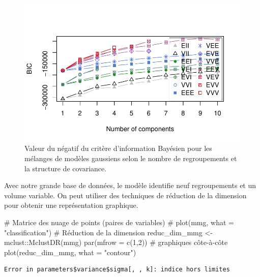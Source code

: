 \documentclass[
  11pt,
  letterpaper,
]{scrbook}
\newenvironment{Shaded}{\begin{snugshade}}{\end{snugshade}}
\newcommand{\AttributeTok}[1]{\textcolor[rgb]{0.40,0.45,0.13}{#1}}
\newcommand{\CommentTok}[1]{\textcolor[rgb]{0.37,0.37,0.37}{#1}}
\newcommand{\DecValTok}[1]{\textcolor[rgb]{0.68,0.00,0.00}{#1}}
\newcommand{\FunctionTok}[1]{\textcolor[rgb]{0.28,0.35,0.67}{#1}}
\newcommand{\NormalTok}[1]{\textcolor[rgb]{0.00,0.23,0.31}{#1}}
\newcommand{\OtherTok}[1]{\textcolor[rgb]{0.00,0.23,0.31}{#1}}
\newcommand{\SpecialCharTok}[1]{\textcolor[rgb]{0.37,0.37,0.37}{#1}}
\newcommand{\StringTok}[1]{\textcolor[rgb]{0.13,0.47,0.30}{#1}}
\theoremstyle{definition}
\theoremstyle{remark}
\begin{document}
\begin{figure}[ht!]

{\centering \includegraphics{./03-regroupements_files/figure-pdf/fig-mclustbic-1.pdf}

}

\caption{\label{fig-mclustbic}Valeur du négatif du critère d'information
Bayésien pour les mélanges de modèles gaussiens selon le nombre de
regroupements et la structure de covariance.}

\end{figure}

Avec notre grande base de données, le modèle identifie neuf
regroupements et un volume variable. On peut utiliser des techniques de
réduction de la dimension pour obtenir une représentation graphique.

\begin{Shaded}
\begin{Highlighting}[]
\CommentTok{\# Matrice des nuage de points (paires de variables)}
\CommentTok{\# plot(mmg, what = "classification")}
\CommentTok{\# Réduction de la dimension}
\NormalTok{reduc\_dim\_mmg }\OtherTok{\textless{}{-}}\NormalTok{ mclust}\SpecialCharTok{::}\FunctionTok{MclustDR}\NormalTok{(mmg)}
\FunctionTok{par}\NormalTok{(}\AttributeTok{mfrow =} \FunctionTok{c}\NormalTok{(}\DecValTok{1}\NormalTok{,}\DecValTok{2}\NormalTok{)) }\CommentTok{\# graphiques côte{-}à{-}côte}
\FunctionTok{plot}\NormalTok{(reduc\_dim\_mmg, }\AttributeTok{what =} \StringTok{"contour"}\NormalTok{)}
\end{Highlighting}
\end{Shaded}

\begin{verbatim}
Error in parameters$variance$sigma[, , k]: indice hors limites
\end{verbatim}
\end{document}
